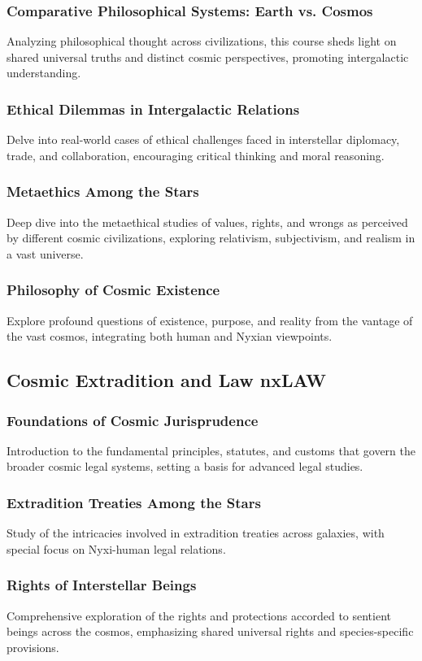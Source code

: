 \subsubsection{Comparative Philosophical Systems: Earth vs. Cosmos}
Analyzing philosophical thought across civilizations, this course sheds light on shared universal truths and distinct cosmic perspectives, promoting intergalactic understanding.
\subsubsection{Ethical Dilemmas in Intergalactic Relations}
Delve into real-world cases of ethical challenges faced in interstellar diplomacy, trade, and collaboration, encouraging critical thinking and moral reasoning.
\subsubsection{Metaethics Among the Stars}
Deep dive into the metaethical studies of values, rights, and wrongs as perceived by different cosmic civilizations, exploring relativism, subjectivism, and realism in a vast universe.
\subsubsection{Philosophy of Cosmic Existence}
Explore profound questions of existence, purpose, and reality from the vantage of the vast cosmos, integrating both human and Nyxian viewpoints.


\subsection{Cosmic Extradition and Law \hfill nxLAW}
\subsubsection{Foundations of Cosmic Jurisprudence}
Introduction to the fundamental principles, statutes, and customs that govern the broader cosmic legal systems, setting a basis for advanced legal studies.
\subsubsection{Extradition Treaties Among the Stars}
Study of the intricacies involved in extradition treaties across galaxies, with special focus on Nyxi-human legal relations.
\subsubsection{Rights of Interstellar Beings}
Comprehensive exploration of the rights and protections accorded to sentient beings across the cosmos, emphasizing shared universal rights and species-specific provisions.
